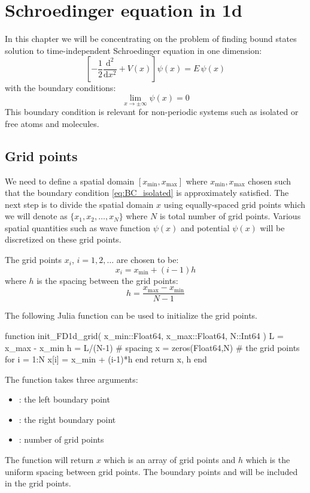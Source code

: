 \chapter{Schroedinger equation in 1d}
%
In this chapter we will be concentrating on the problem of
finding bound states solution to time-independent
Schroedinger equation in one dimension:
\begin{equation}
\left[ -\frac{1}{2}\frac{\mathrm{d}^2}{\mathrm{d}x^2} + V(x) \right] \psi(x) = E\, \psi(x)
\label{eq:Sch_1d_eq}
\end{equation}
%
with the boundary conditions:
%
\begin{equation}
\lim_{x \rightarrow \pm \infty} \psi(x) = 0
\label{eq:BC_isolated}
\end{equation}
%
This boundary condition is relevant for non-periodic systems such as
isolated or free atoms and molecules.

\section{Grid points}

We need to define a spatial domain $\left[x_{\mathrm{min}}, x_{\mathrm{max}}\right]$
where $x_{\mathrm{min}}, x_{\mathrm{max}}$ chosen
such that the boundary condition \ref{eq:BC_isolated} is approximately satisfied.
The next step is to divide the spatial domain $x$ using equally-spaced grid points
which we will denote as $\{x_{1},x_{2},\ldots,x_{N}\}$ where $N$ is total number
of grid points. Various spatial quantities such as wave function $\psi(x)$
and potential $\psi(x)$ will be discretized on these grid points.

The grid points $x_{i}$, $i = 1, 2, \ldots$ are chosen to be:
%
\begin{equation}
x_{i} = x_{\mathrm{min}} + (i-1)h
\end{equation}
%
where $h$ is the spacing between the grid points:
%
\begin{equation}
h = \frac{ x_{\mathrm{max}} - x_{\mathrm{min}} }{N-1}
\end{equation}

The following Julia function can be used to initialize the grid points.
\begin{juliacode}
function init_FD1d_grid( x_min::Float64, x_max::Float64, N::Int64 )
  L = x_max - x_min
  h = L/(N-1) # spacing
  x = zeros(Float64,N) # the grid points
  for i = 1:N
    x[i] = x_min + (i-1)*h
  end
  return x, h
end
\end{juliacode}
The function  takes three arguments:
\begin{itemize}
\item {}: the left boundary point
\item {}: the right boundary point
\item {}: number of grid points
\end{itemize}
The function will return $x$ which is an array of grid points and $h$ which
is the uniform spacing between grid points. The boundary points 
and  will be included in the grid points.

